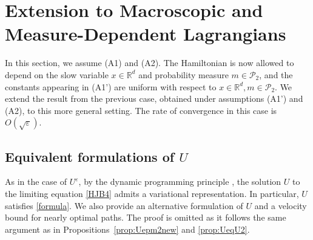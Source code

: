 \documentclass[reqno,11pt]{amsart}
\numberwithin{equation}{section}
\newcommand{\e}{\varepsilon}
\newcommand{\nd}{\noindent}
\begin{document}
\section{Extension to Macroscopic and Measure-Dependent Lagrangians}\label{sec:generall}

\nd
In this section, we assume {\rm (A1)} and {\rm (A2)}. The Hamiltonian is now allowed to depend on the slow variable $x \in \mathbb{R}^d$ and probability measure $m \in \mathcal{P}_2$, and the constants appearing in (A1') are uniform with respect to $x\in \mathbb{R}^d, m \in \mathcal{P}_2$. We extend the result from the previous case, obtained under assumptions (A1') and (A2), to this more general setting. The rate of convergence in this case is $O(\sqrt{\e})$.



\subsection{Equivalent formulations of $U$}
As in the case of $U^\varepsilon$, by the dynamic programming principle \cite{djete2022mckean1}, the solution $U$ to the limiting equation \eqref{HJB4} admits a variational representation. In particular, $U$ satisfies \eqref{formula}. We also provide an alternative formulation of $U$ and a velocity bound for nearly optimal paths. The proof is omitted as it follows the same argument as in Propositions~\ref{prop:Uepm2new} and \ref{prop:UeqU2}.
\end{document}
